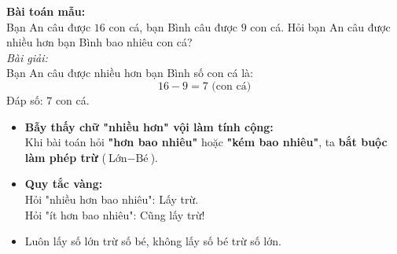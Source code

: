 \documentclass[11pt,a4paper]{article}
\begin{document}
\vspace{-1.5mm}
\noindent
\begin{minipage}[t]{0.49\textwidth}\vspace{0pt}
\begin{tcolorbox}[
  enhanced,
  colback=green!4!white,
  colframe=green!60!black,
  arc=2mm, boxrule=0.8pt,
  left=2mm, right=2mm, top=1.8mm, bottom=1.8mm,
  title={\footnotesize\bfseries\color{white}\faCheckCircle\ 4. Ví dụ thực hành chuẩn mực}
]
{\footnotesize
\textbf{Bài toán mẫu:}\\
Bạn An câu được $16$ con cá, bạn Bình câu được $9$ con cá. Hỏi bạn An câu được nhiều hơn bạn Bình bao nhiêu con cá?\\
\textit{Bài giải:}\\
Bạn An câu được nhiều hơn bạn Bình số con cá là:
$$16 - 9 = 7\text{ (con cá)}$$
Đáp số: $7$ con cá.
}
\end{tcolorbox}
\end{minipage}
\hfill
\begin{minipage}[t]{0.49\textwidth}\vspace{0pt}
\begin{tcolorbox}[
  enhanced,
  colback=red!4!white,
  colframe=red!75!black,
  arc=2mm, boxrule=0.8pt,
  left=2mm, right=2mm, top=1.8mm, bottom=1.8mm,
  title={\footnotesize\bfseries\color{white}\faExclamationTriangle\ 5. Mẹo tránh bẫy trắc nghiệm}
]
{\footnotesize
\begin{itemize}\setlength{\itemsep}{1pt}\setlength{\leftskip}{-2.5mm}
  \item \textbf{Bẫy thấy chữ "nhiều hơn" vội làm tính cộng:}\\
  Khi bài toán hỏi \textbf{"hơn bao nhiêu"} hoặc \textbf{"kém bao nhiêu"}, ta \textbf{bắt buộc làm phép trừ} ($\text{Lớn} - \text{Bé}$).
  \item \textbf{Quy tắc vàng:}\\
  Hỏi "nhiều hơn bao nhiêu": Lấy trừ.\\
  Hỏi "ít hơn bao nhiêu": Cũng lấy trừ!
  \item Luôn lấy số lớn trừ số bé, không lấy số bé trừ số lớn.
\end{itemize}
}
\end{tcolorbox}
\end{minipage}
\end{document}
